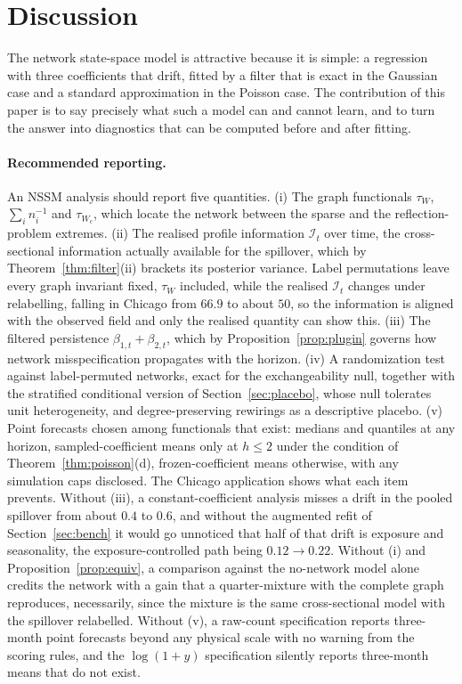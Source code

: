 \documentclass[12pt]{article}
\theoremstyle{plain}
\theoremstyle{definition}
\theoremstyle{remark}
\newcommand{\calI}{\mathcal{I}}
\newcommand{\Wc}{W_{\mathrm{c}}}
\newcommand{\tauW}{\tau_W}
\newcommand{\FinalBOneFirst}{0.12}
\newcommand{\FinalBOneLast}{0.22}
\begin{document}
\section{Discussion}\label{sec:disc}

The network state-space model is attractive because it is simple: a regression with three coefficients that drift, fitted by a filter that is exact in the Gaussian case and a standard approximation in the Poisson case. The contribution of this paper is to say precisely what such a model can and cannot learn, and to turn the answer into diagnostics that can be computed before and after fitting.

\paragraph{Recommended reporting.} An NSSM analysis should report five quantities. (i) The graph functionals $\tauW$, $\sum_in_i^{-1}$ and $\tau_{\Wc}$, which locate the network between the sparse and the reflection-problem extremes. (ii) The realised profile information $\calI_t$ over time, the cross-sectional information actually available for the spillover, which by Theorem~\ref{thm:filter}(ii) brackets its posterior variance. Label permutations leave every graph invariant fixed, $\tauW$ included, while the realised $\calI_t$ changes under relabelling, falling in Chicago from $66.9$ to about $50$, so the information is aligned with the observed field and only the realised quantity can show this. (iii) The filtered persistence $\beta_{1,t}+\beta_{2,t}$, which by Proposition~\ref{prop:plugin} governs how network misspecification propagates with the horizon. (iv) A randomization test against label-permuted networks, exact for the exchangeability null, together with the stratified conditional version of Section~\ref{sec:placebo}, whose null tolerates unit heterogeneity, and degree-preserving rewirings as a descriptive placebo. (v) Point forecasts chosen among functionals that exist: medians and quantiles at any horizon, sampled-coefficient means only at $h\le2$ under the condition of Theorem~\ref{thm:poisson}(d), frozen-coefficient means otherwise, with any simulation caps disclosed. The Chicago application shows what each item prevents. Without (iii), a constant-coefficient analysis misses a drift in the pooled spillover from about $0.4$ to $0.6$, and without the augmented refit of Section~\ref{sec:bench} it would go unnoticed that half of that drift is exposure and seasonality, the exposure-controlled path being $\FinalBOneFirst\to\FinalBOneLast$. Without (i) and Proposition~\ref{prop:equiv}, a comparison against the no-network model alone credits the network with a gain that a quarter-mixture with the complete graph reproduces, necessarily, since the mixture is the same cross-sectional model with the spillover relabelled. Without (v), a raw-count specification reports three-month point forecasts beyond any physical scale with no warning from the scoring rules, and the $\log(1+y)$ specification silently reports three-month means that do not exist.
\end{document}
